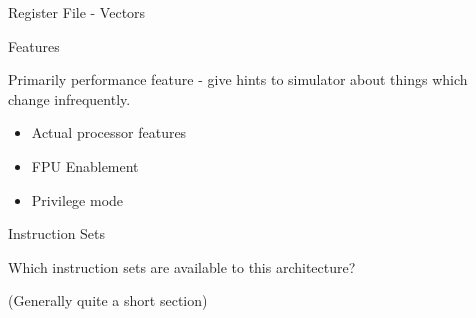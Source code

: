 \begin{frame}{Register File - Vectors}
\begin{minipage}[t]{0.95\textwidth}
\begin{block}{}
\usebox{\codeboxtwo}

\end{block}
\end{minipage}

\end{frame}

\begin{frame}{Features}

Primarily performance feature - give hints to simulator about things 
which change infrequently.

\begin{itemize}
\item Actual processor features
\item FPU Enablement
\item Privilege mode
\end{itemize}

\end{frame}

\begin{frame}{Instruction Sets}

Which instruction sets are available to this architecture?

(Generally quite a short section)

\end{frame}
